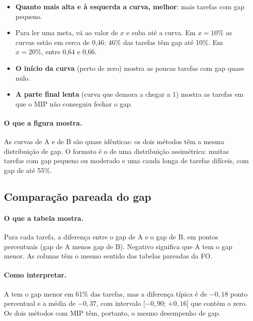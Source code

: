 \documentclass[11pt,a4paper]{article}
\begin{document}
\begin{itemize}[leftmargin=*]
  \item \textbf{Quanto mais alta e à esquerda a curva, melhor}: mais tarefas com gap pequeno.
  \item Para ler uma meta, vá ao valor de $x$ e suba até a curva. Em $x=10\%$ as curvas estão em
  cerca de 0,46: 46\% das tarefas têm gap até 10\%. Em $x=20\%$, entre 0,64 e 0,66.
  \item \textbf{O início da curva} (perto de zero) mostra as poucas tarefas com gap quase nulo.
  \item \textbf{A parte final lenta} (curva que demora a chegar a 1) mostra as tarefas em que o MIP
  não conseguiu fechar o gap.
\end{itemize}

\paragraph{O que a figura mostra.} As curvas de A e de B são quase idênticas: os dois
métodos têm a mesma distribuição de gap. O formato é o de uma distribuição assimétrica:
muitas tarefas com gap pequeno ou moderado e uma cauda longa de tarefas difíceis, com
gap de até 55\%.

\subsection{Comparação pareada do gap}

\begin{table}[H]
  \centering
  \scriptsize
  \resizebox{\textwidth}{!}{}
  \caption{Diferença do gap entre A e B, tarefa a tarefa, em pontos percentuais (p.p.).}
  \label{tab:gap-pareado}
\end{table}

\paragraph{O que a tabela mostra.} Para cada tarefa, a diferença entre o gap de A e o
gap de B, em pontos percentuais (gap de A menos gap de B). Negativo significa que A tem o
gap menor. As colunas têm o mesmo sentido das tabelas pareadas da FO.

\paragraph{Como interpretar.} A tem o gap menor em 61\% das tarefas, mas a diferença típica
é de $-0{,}18$ ponto percentual e a média de $-0{,}37$, com intervalo [$-0{,}90$; $+0{,}16$] que
contém o zero. Os dois métodos com MIP têm, portanto, o mesmo desempenho de gap.
\end{document}
